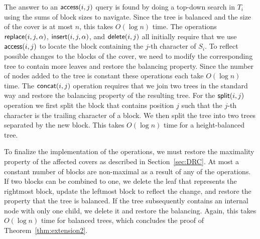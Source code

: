 The answer to an $\mathsf{access}(i, j)$ query is found by doing a top-down search in $T_i$ using the sums of block sizes to navigate. Since the tree is balanced and the size of the cover is at most $n$, this takes $O(\log n)$ time. The operations $\mathsf{replace}(i,j,\alpha)$, $\mathsf{insert}(i,j,\alpha)$, and $\mathsf{delete}(i,j)$ all initially require that we use $\mathsf{access}(i,j)$ to locate the block containing the $j$-th character of $S_i$. To reflect possible changes to the blocks of the cover, we need to modify the corresponding tree to contain more leaves and restore the balancing property. Since the number of nodes added to the tree is constant these operations each take $O(\log n)$ time. The $\mathsf{concat}(i,j)$ operation requires that we join two trees in the standard way and restore the balancing property of the resulting tree. For the $\mathsf{split}(i,j)$ operation we first split the block that contains position $j$ such that the $j$-th character is the trailing character of a block. We then split the tree into two trees separated by the new block. This takes $O(\log n)$ time for a height-balanced tree.

To finalize the implementation of the operations, we must restore the maximality property of the affected covers as described in Section~\ref{sec:DRC}. At most a constant number of blocks are non-maximal as a result of any of the operations. If two blocks can be combined to one, we delete the leaf that represents the rightmost block, update the leftmost block to reflect the change, and restore the property that the tree is balanced. If the tree subsequently contains an internal node with only one child, we delete it and restore the balancing. Again, this takes $O(\log n)$ time for balanced trees, which concludes the proof of Theorem~\ref{thm:extension2}.





